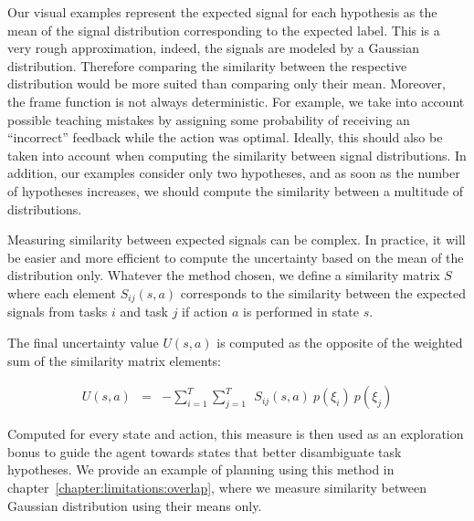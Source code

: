 
Our visual examples represent the expected signal for each hypothesis as the mean of the signal distribution corresponding to the expected label. This is a very rough approximation, indeed, the signals are modeled by a Gaussian distribution. Therefore comparing the similarity between the respective distribution would be more suited than comparing only their mean. Moreover, the frame function is not always deterministic. For example, we take into account possible teaching mistakes by assigning some probability of receiving an ``incorrect'' feedback while the action was optimal. Ideally, this should also be taken into account when computing the similarity between signal distributions. In addition, our examples consider only two hypotheses, and as soon as the number of hypotheses increases, we should compute the similarity between a multitude of distributions. 

Measuring similarity between expected signals can be complex. In practice, it will be easier and more efficient to compute the uncertainty based on the mean of the distribution only. Whatever the method chosen, we define a similarity matrix $S$ where each element $S_{ij}(s,a)$ corresponds to the similarity between the expected signals from tasks $i$ and task $j$ if action $a$ is performed in state $s$.


The final uncertainty value $U(s,a)$ is computed as the opposite of the weighted sum of the similarity matrix elements:

\begin{eqnarray}
U(s,a) &=& - \sum_{i = 1}^{T} \sum_{j = 1}^{T} ~~ S_{ij}(s,a) ~ p(\xi_i) ~ p(\xi_j)
\end{eqnarray}


Computed for every state and action, this measure is then used as an exploration bonus to guide the agent towards states that better disambiguate task hypotheses. We provide an example of planning using this method in chapter~\ref{chapter:limitations:overlap}, where we measure similarity between Gaussian distribution using their means only.

